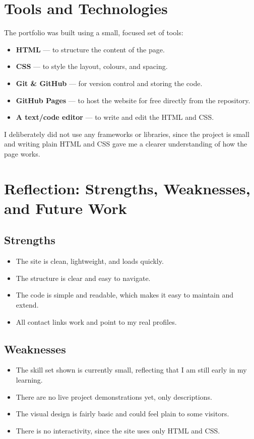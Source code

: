 \documentclass[11pt,a4paper]{article}
\begin{document}
\section{Tools and Technologies}
The portfolio was built using a small, focused set of tools:

\begin{itemize}
  \item \textbf{HTML} --- to structure the content of the page.
  \item \textbf{CSS} --- to style the layout, colours, and spacing.
  \item \textbf{Git \& GitHub} --- for version control and storing the code.
  \item \textbf{GitHub Pages} --- to host the website for free directly from
    the repository.
  \item \textbf{A text/code editor} --- to write and edit the HTML and CSS.
\end{itemize}

I deliberately did not use any frameworks or libraries, since the project is
small and writing plain HTML and CSS gave me a clearer understanding of how
the page works.

\section{Reflection: Strengths, Weaknesses, and Future Work}

\subsection{Strengths}
\begin{itemize}
  \item The site is clean, lightweight, and loads quickly.
  \item The structure is clear and easy to navigate.
  \item The code is simple and readable, which makes it easy to maintain and
    extend.
  \item All contact links work and point to my real profiles.
\end{itemize}

\subsection{Weaknesses}
\begin{itemize}
  \item The skill set shown is currently small, reflecting that I am still
    early in my learning.
  \item There are no live project demonstrations yet, only descriptions.
  \item The visual design is fairly basic and could feel plain to some visitors.
  \item There is no interactivity, since the site uses only HTML and CSS.
\end{itemize}
\end{document}
